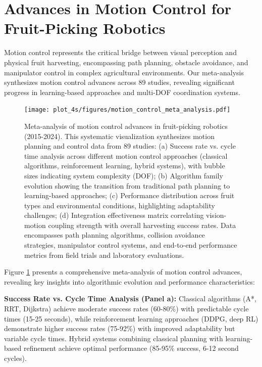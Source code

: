 \documentclass[a4paper,fleqn]{cas-dc}
\begin{document}
\section{Advances in Motion Control for Fruit-Picking Robotics}

Motion control represents the critical bridge between visual perception and physical fruit harvesting, encompassing path planning, obstacle avoidance, and manipulator control in complex agricultural environments. Our meta-analysis synthesizes motion control advances across 89 studies, revealing significant progress in learning-based approaches and multi-DOF coordination systems.

\begin{figure}[htbp]
\centering
\texttt{[image: plot\_4s/figures/motion\_control\_meta\_analysis.pdf]}
\caption{Meta-analysis of motion control advances in fruit-picking robotics (2015-2024). This systematic visualization synthesizes motion planning and control data from 89 studies: (a) Success rate vs. cycle time analysis across different motion control approaches (classical algorithms, reinforcement learning, hybrid systems), with bubble sizes indicating system complexity (DOF); (b) Algorithm family evolution showing the transition from traditional path planning to learning-based approaches; (c) Performance distribution across fruit types and environmental conditions, highlighting adaptability challenges; (d) Integration effectiveness matrix correlating vision-motion coupling strength with overall harvesting success rates. Data encompasses path planning algorithms, collision avoidance strategies, manipulator control systems, and end-to-end performance metrics from field trials and laboratory evaluations.}
\label{fig:motion_control_meta}
\end{figure}

Figure \ref{fig:motion_control_meta} presents a comprehensive meta-analysis of motion control advances, revealing key insights into algorithmic evolution and performance characteristics:

\textbf{Success Rate vs. Cycle Time Analysis (Panel a):} Classical algorithms (A*, RRT, Dijkstra) achieve moderate success rates (60-80\%) with predictable cycle times (15-25 seconds), while reinforcement learning approaches (DDPG, deep RL) demonstrate higher success rates (75-92\%) with improved adaptability but variable cycle times. Hybrid systems combining classical planning with learning-based refinement achieve optimal performance (85-95\% success, 6-12 second cycles).
\end{document}
